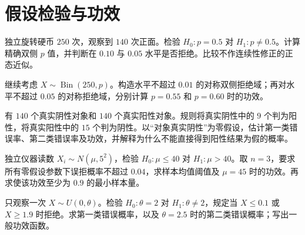 \clearpage\section{假设检验与功效}

\begin{exercise}[硬币的精确双侧检验]\label{q:M-P8-1ab}
独立旋转硬币 $250$ 次，观察到 $140$ 次正面。检验 $H_0:p=0.5$ 对 $H_1:p\ne0.5$。计算精确双侧 $p$ 值，并判断在 $0.10$ 与 $0.05$ 水平是否拒绝。比较不作连续性修正的正态近似。\par{}\end{exercise}

\begin{exercise}[离散拒绝域与功效]\label{q:M-P8-1cd}
继续考虑 $X\sim\operatorname{Bin}(250,p)$。构造水平不超过 $0.01$ 的对称双侧拒绝域；再对水平不超过 $0.05$ 的对称拒绝域，分别计算 $p=0.55$ 和 $p=0.60$ 时的功效。\par{}\end{exercise}

\begin{exercise}[第一类与第二类错误]\label{q:M-P8-2}
有 $140$ 个真实阴性对象和 $140$ 个真实阳性对象。规则将真实阴性中的 $9$ 个判为阳性，将真实阳性中的 $15$ 个判为阴性。以“对象真实阴性”为零假设，估计第一类错误率、第二类错误率及功效，并解释为什么不能直接得到阳性结果为假的概率。\par{}\end{exercise}

\begin{exercise}[复合零假设与功效规划]\label{q:M-P8-3}
独立仪器读数 $X_i\sim N(\mu,5^2)$，检验 $H_0:\mu\le40$ 对 $H_1:\mu>40$。取 $n=3$，要求所有零假设参数下误拒概率不超过 $0.04$，求样本均值阈值及 $\mu=45$ 时的功效。再求使该功效至少为 $0.9$ 的最小样本量。\par{}\end{exercise}

\begin{exercise}[直接计算两类错误]\label{q:M-P8-4}
只观察一次 $X\sim U(0,\theta)$。检验 $H_0:\theta=2$ 对 $H_1:\theta\ne2$，规定当 $X\le0.1$ 或 $X\ge1.9$ 时拒绝。求第一类错误概率，以及 $\theta=2.5$ 时的第二类错误概率；写出一般功效函数。\par{}\end{exercise}

